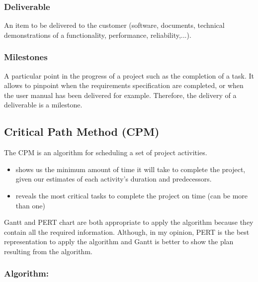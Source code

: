 \subsubsection{Deliverable}
An item to be delivered to the customer (software, documents, technical demonstrations of a functionality, performance, reliability,...).

\subsubsection{Milestones}
A particular point in the progress of a project such as the completion of a task. It allows to pinpoint when the requirements specification are completed, or when the user manual has been delivered for example. Therefore, the delivery of a deliverable is a milestone.


\subsection{Critical Path Method (CPM)}

The CPM is an algorithm for scheduling a set of project activities.
\begin{itemize}
    \item shows us the minimum amount of time it will take to
        complete the project, given our estimates of each activity’s duration
        and predecessors.
    \item reveals the most critical tasks to complete
        the project on time (can be more than one)
\end{itemize}


Gantt and PERT chart are both appropriate to apply the algorithm because they contain all the
required information. Although, in my opinion, PERT is the best representation to apply the
algorithm and Gantt is better to show the plan resulting from the algorithm.

\subsubsection{Algorithm:}

